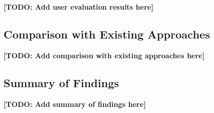 \textbf{[TODO: Add user evaluation results here]}

\subsection{Comparison with Existing Approaches}


\textbf{[TODO: Add comparison with existing approaches here]}

\subsection{Summary of Findings}


\textbf{[TODO: Add summary of findings here]}